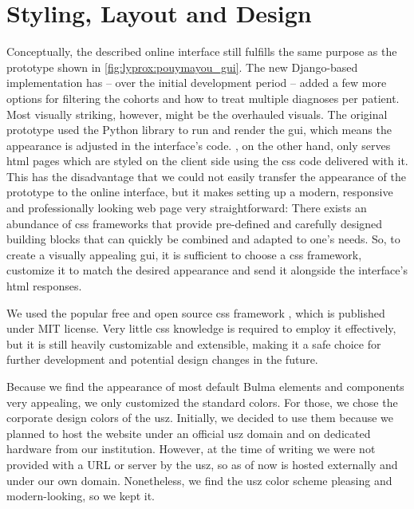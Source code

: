 \documentclass[\relativeRoot/main.tex]{subfiles}
\begin{document}
\section{Styling, Layout and Design}
\label{sec:lyprox:design}

Conceptually, the described online interface still fulfills the same purpose as the prototype shown in \cref{fig:lyprox:pouymayou_gui}. The new Django-based implementation has -- over the initial development period -- added a few more options for filtering the cohorts and how to treat multiple diagnoses per patient. Most visually striking, however, might be the overhauled visuals. The original prototype used the Python library  to run and render the \gls{gui}, which means the appearance is adjusted in the interface's code. \inlinelyproxlogo{}, on the other hand, only serves \acrshort{html} pages which are styled on the client side using the \acrshort{css} code delivered with it. This has the disadvantage that we could not easily transfer the appearance of the prototype to the online interface, but it makes setting up a modern, responsive and professionally looking web page very straightforward: There exists an abundance of \acrshort{css} frameworks that provide pre-defined and carefully designed building blocks that can quickly be combined and adapted to one's needs. So, to create a visually appealing \gls{gui}, it is sufficient to choose a \acrshort{css} framework, customize it to match the desired appearance and send it alongside the interface's \acrshort{html} responses.

We used the popular free and open source \acrshort{css} framework  \cite{thomas_bulma_2021}, which is published under MIT license. Very little \acrshort{css} knowledge is required to employ it effectively, but it is still heavily customizable and extensible, making it a safe choice for further development and potential design changes in the future.

Because we find the appearance of most default Bulma elements and components very appealing, we only customized the standard colors. For those, we chose the corporate design colors of the \gls{usz}. Initially, we decided to use them because we planned to host the website under an official \gls{usz} domain and on dedicated hardware from our institution. However, at the time of writing we were not provided with a URL or server by the \gls{usz}, so as of now \inlinelyproxlogo{} is hosted externally and under our own domain. Nonetheless, we find the \gls{usz} color scheme pleasing and modern-looking, so we kept it.
\end{document}
